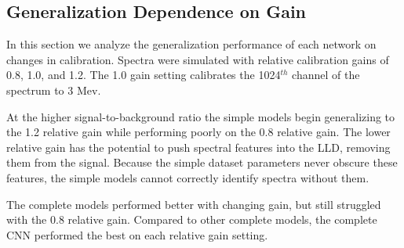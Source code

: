 \subsection{Generalization Dependence on Gain}

In this section we analyze the generalization performance of each network on changes in calibration. Spectra were simulated with relative calibration gains of 0.8, 1.0, and 1.2. The 1.0 gain setting calibrates the 1024$^{th}$ channel of the spectrum to 3 Mev.

At the higher signal-to-background ratio the simple models begin generalizing to the 1.2 relative gain while performing poorly on the 0.8 relative gain. The lower relative gain has the potential to push spectral features into the LLD, removing them from the signal. Because the simple dataset parameters never obscure these features, the simple models cannot correctly identify spectra without them.

The complete models performed better with changing gain, but still struggled with the 0.8 relative gain.  Compared to other complete models, the complete CNN performed the best on each relative gain setting.


